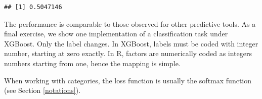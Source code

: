 \documentclass[]{krantz}
\makeatletter
\newenvironment{Shaded}{\begin{snugshade}}{\end{snugshade}}
\newcommand{\CommentTok}[1]{\textcolor[rgb]{0.37,0.37,0.37}{\textit{#1}}}
\newcommand{\DataTypeTok}[1]{\textcolor[rgb]{0.27,0.27,0.27}{#1}}
\newcommand{\DecValTok}[1]{\textcolor[rgb]{0.06,0.06,0.06}{#1}}
\newcommand{\FloatTok}[1]{\textcolor[rgb]{0.06,0.06,0.06}{#1}}
\newcommand{\KeywordTok}[1]{\textcolor[rgb]{0.27,0.27,0.27}{\textbf{#1}}}
\newcommand{\NormalTok}[1]{#1}
\newcommand{\OperatorTok}[1]{\textcolor[rgb]{0.43,0.43,0.43}{\textbf{#1}}}
\newcommand{\StringTok}[1]{\textcolor[rgb]{0.5,0.5,0.5}{#1}}
\newenvironment{kframe}{%
\medskip{}
\setlength{\fboxsep}{.8em}
 \def\at@end@of@kframe{}%
 \ifinner\ifhmode%
  \def\at@end@of@kframe{\end{minipage}}%
  \begin{minipage}{\columnwidth}%
 \fi\fi%
 \def\FrameCommand##1{\hskip\@totalleftmargin \hskip-\fboxsep
 \colorbox{shadecolor}{##1}\hskip-\fboxsep
     \hskip-\linewidth \hskip-\@totalleftmargin \hskip\columnwidth}%
 \MakeFramed {\advance\hsize-\width
   \@totalleftmargin\z@ \linewidth\hsize
   \@setminipage}}%
 {\par\unskip\endMakeFramed%
 \at@end@of@kframe}
\renewenvironment{Shaded}{\begin{kframe}}{\end{kframe}}
\theoremstyle{definition}
\theoremstyle{definition}
\theoremstyle{definition}
\theoremstyle{remark}
\makeatother
\begin{document}
\begin{Shaded}
\end{Shaded}

\begin{verbatim}
## [1] 0.5047146
\end{verbatim}

\normalsize

The performance is comparable to those observed for other predictive
tools. As a final exercise, we show one implementation of a
classification task under XGBoost. Only the label changes. In XGBoost,
labels must be coded with integer number, starting at zero exactly. In
R, factors are numerically coded as integers numbers starting from one,
hence the mapping is simple.

\footnotesize

\begin{Shaded}
\end{Shaded}

\normalsize

When working with categories, the loss function is usually the softmax
function (see Section \ref{notations}).
\end{document}
